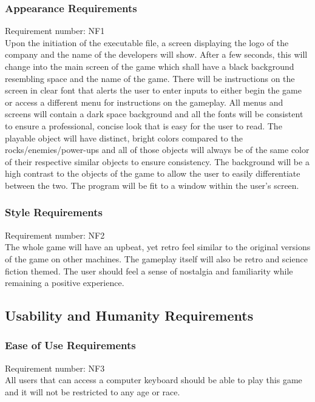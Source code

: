 \documentclass[12pt, titlepage]{article}
\begin{document}
\subsubsection{Appearance Requirements}
Requirement number: NF1
\\Upon the initiation of the executable file, a screen displaying the logo of the company and the name of the developers will show. After a few seconds, this will change into the main screen of the game which shall have a black background resembling space and the name of the game. There will be instructions on the screen in clear font that alerts the user to enter inputs to either begin the game or access a different menu for instructions on the gameplay. All menus and screens will contain a dark space background and all the fonts will be consistent to ensure a professional, concise look that is easy for the user to read. The playable object will have distinct, bright colors compared to the rocks/enemies/power-ups and all of those objects will always be of the same color of their respective similar objects to ensure consistency. The background will be a high contrast to the objects of the game to allow the user to easily differentiate between the two. The program will be fit to a window within the user's screen.

\subsubsection{Style Requirements}
Requirement number: NF2
\\The whole game will have an upbeat, yet retro feel similar to the original versions of the game on other machines. The gameplay itself will also be retro and science fiction themed. The user should feel a sense of nostalgia and familiarity while remaining a positive experience.

\subsection{Usability and Humanity Requirements}

\subsubsection{Ease of Use Requirements}
Requirement number: NF3
\\All users that can access a computer keyboard should be able to play this game and it will not be restricted to any age or race. 
\end{document}

